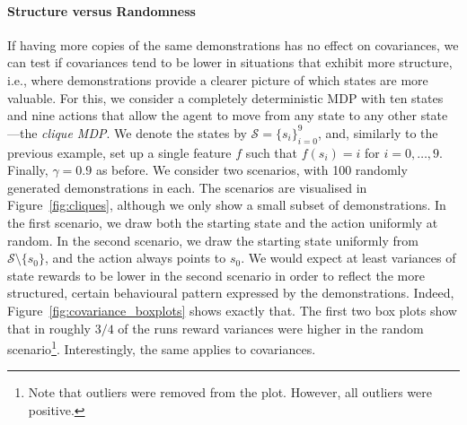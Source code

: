 \documentclass{mpaper}
\begin{document}
\paragraph{Structure versus Randomness}

If having more copies of the same demonstrations has no effect on covariances,
we can test if covariances tend to be lower in situations that exhibit more
structure, i.e., where demonstrations provide a clearer picture of which states
are more valuable. For this, we consider a completely deterministic MDP with ten
states and nine actions that allow the agent to move from any state to any other
state---the \emph{clique MDP}. We denote the states by $\mathcal{S} = \{ s_i
\}_{i=0}^9$, and, similarly to the previous example, set up a single feature $f$
such that $f(s_i) = i$ for $i = 0, \dots, 9$. Finally, $\gamma = 0.9$ as before.
We consider two scenarios, with 100 randomly generated demonstrations in each.
The scenarios are visualised in Figure~\ref{fig:cliques}, although we only show
a small subset of demonstrations. In the first scenario, we draw both the
starting state and the action uniformly at random. In the second scenario, we
draw the starting state uniformly from $\mathcal{S} \setminus \{ s_0 \}$, and
the action always points to $s_0$. We would expect at least variances of state
rewards to be lower in the second scenario in order to reflect the more
structured, certain behavioural pattern expressed by the demonstrations. Indeed,
Figure~\ref{fig:covariance_boxplots} shows exactly that. The first two box plots
show that in roughly $3/4$ of the runs reward variances were higher in the
random scenario\footnote{Note that outliers were removed from the plot. However,
  all outliers were positive.}. Interestingly, the same applies to covariances.
\end{document}
